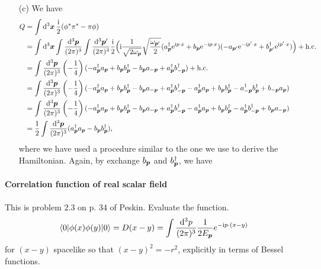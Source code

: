 \documentclass[hyperref, a4paper]{article}
\newcommand*{\ii}{\mathrm{i}}
\newcommand*{\ee}{\mathrm{e}}
\begin{document}
\begin{itemize}
    \item[(c)] We have 
    \[
        \begin{aligned}
            Q &= \int \dd[3]{\vb*{x}} \frac{\ii}{2} (\phi^* \pi^* - \pi \phi) \\
            &= \int \dd[3]{\vb*{x}} \int \frac{\dd[3]{\vb*{p}}}{(2\pi)^3}  \int \frac{\dd[3]{\vb*{p}'}}{(2\pi)^3}\frac{\ii}{2} \Big( \ii \frac{1}{\sqrt{2 \omega_{\vb*{p}}}} \sqrt{\frac{\omega_{\vb*{p}'}}{2}} (a^\dagger_{\vb*{p}} \ee^{\ii p \cdot x} + b_{\vb*{p}} \ee^{- \ii p \cdot x} ) (- a_{\vb*{p}'} \ee^{- \ii p' \cdot x} + b^\dagger_{\vb*{p}'} \ee^{\ii p' \cdot x}) \Big) + \text{h.c.} \\
            &= \int \frac{\dd[3]{\vb*{p}}}{(2\pi)^3} \left( - \frac{1}{4} \right) ( - a_{\vb*{p}}^\dagger a_{\vb*{p}} + b_{\vb*{p}} b^\dagger_{\vb*{p}} - b_{\vb*{p}} a_{- \vb*{p}} + a^\dagger_{\vb*{p}} b^\dagger_{- \vb*{p}} ) + \text{h.c.} \\
            &= \int \frac{\dd[3]{\vb*{p}}}{(2\pi)^3} \left( - \frac{1}{4} \right) ( - a_{\vb*{p}}^\dagger a_{\vb*{p}} + b_{\vb*{p}} b^\dagger_{\vb*{p}} - b_{\vb*{p}} a_{- \vb*{p}} + a^\dagger_{\vb*{p}} b^\dagger_{- \vb*{p}}  - a_{\vb*{p}}^\dagger a_{\vb*{p}} + b_{\vb*{p}} b^\dagger_{\vb*{p}} - a_{- \vb*{p}}^\dagger b^\dagger_{\vb*{p}} + b_{- \vb*{p}} a_{\vb*{p}} ) \\
            &= \int \frac{\dd[3]{\vb*{p}}}{(2\pi)^3} \left( - \frac{1}{4} \right) ( - a_{\vb*{p}}^\dagger a_{\vb*{p}} + b_{\vb*{p}} b^\dagger_{\vb*{p}} - b_{\vb*{p}} a_{- \vb*{p}} + a^\dagger_{\vb*{p}} b^\dagger_{- \vb*{p}}  - a_{\vb*{p}}^\dagger a_{\vb*{p}} + b_{\vb*{p}} b^\dagger_{\vb*{p}} - a_{\vb*{p}}^\dagger b^\dagger_{- \vb*{p}} + b_{ \vb*{p}} a_{- \vb*{p}} ) \\
            &= \frac{1}{2} \int \frac{\dd[3]{\vb*{p}}}{(2\pi)^3} (a^\dagger_{\vb*{p}} a_{\vb*{p}} - b_{\vb*{p}} b^\dagger_{\vb*{p}}),
        \end{aligned}
    \] 
    where we have used a procedure similar to the one we use to derive the Hamiltonian.
    Again, by exchange $b_{\vb*{p}}$ and $b^\dagger_{\vb*{p}}$, we have 
    
\end{itemize}

\paragraph{}

\paragraph{Correlation function of real scalar field} This is problem $2.3$ on p. 34 of Peskin. Evaluate the function. 
\[
\langle 0|\phi(x) \phi(y)| 0\rangle=D(x-y)=\int \frac{\dd^{3} p}{(2 \pi)^{3}} \frac{1}{2 E_{\vb*{p}}} e^{-\ii p \cdot (x-y)}
\]
for $(x-y)$ spacelike so that $(x-y)^{2}=-r^{2}$, explicitly in terms of Bessel functions.
\end{document}
